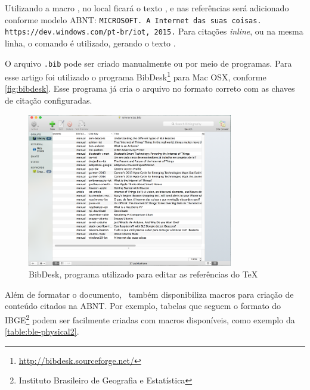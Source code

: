 Utilizando a macro \texttt{}, no local ficará o texto \cite{windows10-iot}, e nas referências será adicionado conforme modelo ABNT: \texttt{MICROSOFT. A Internet das suas coisas. https://dev.windows.com/pt-br/iot, 2015.} Para citações \textit{inline}, ou na mesma linha, o comando \texttt{} é utilizado, gerando o texto .

O arquivo \texttt{.bib} pode ser criado manualmente ou por meio de programas. Para esse artigo foi utilizado o programa BibDesk\footnote{\url{http://bibdesk.sourceforge.net/}} para Mac OSX, conforme \autoref{fig:bibdesk}. Esse programa já cria o arquivo no formato correto com as chaves de citação configuradas.

\begin{figure}[htb]
	\caption{\label{fig:bibdesk}BibDesk, programa utilizado para editar as referências do \TeX}
	\begin{center}
		\includegraphics[width=0.8\textwidth]{img/bibdesk.png}
	\end{center}
\end{figure}

Além de formatar o documento, \abnTeX\ também disponibiliza macros para criação de conteúdo citados na ABNT. Por exemplo, tabelas que seguem o formato do IBGE\footnote{Instituto Brasileiro de Geografia e Estatística} podem ser facilmente criadas com macros disponíveis, como exemplo da \autoref{table:ble-physical2}.

